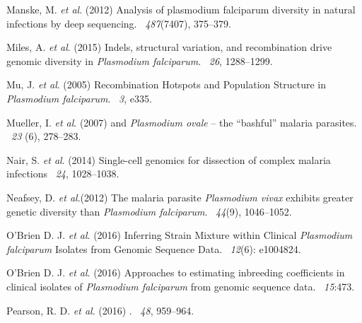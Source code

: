 \documentclass{article}
\begin{document}
\begin{thebibliography}{}
Manske, M. {\em et al}. (2012)
\newblock Analysis of plasmodium falciparum diversity in natural infections by
  deep sequencing.
~{\em 487\/}(7407), 375--379.

Miles, A. {\em et al}. (2015)
\newblock Indels, structural variation, and recombination drive genomic diversity in {\it Plasmodium falciparum}.
~{\em26\/}, 1288--1299.

Mu, J. {\em et al}. (2005)
\newblock Recombination Hotspots and Population Structure in {\it Plasmodium falciparum}.
~{\em 3}, e335.

Mueller, I. {\em et al}. (2007)
 and {\it Plasmodium ovale} -- the ``bashful'' malaria parasites.
~{\em 23\/} (6), 278--283.

Nair, S. {\em et al}. (2014)
\newblock Single-cell genomics for dissection of complex malaria infections
~{\em 24}, 1028--1038.

Neafsey, D. {\em et al}.(2012)
\newblock The malaria parasite {\it Plasmodium vivax} exhibits greater genetic diversity than {\it Plasmodium falciparum}.
~{\em 44\/}(9), 1046--1052.

O'Brien D. J. {\em et al}. (2016)
\newblock Inferring Strain Mixture within Clinical {\em Plasmodium falciparum} Isolates from Genomic Sequence Data.
~{\em 12\/}(6): e1004824.

O'Brien D. J. {\em et al}. (2016)
\newblock Approaches to estimating inbreeding coefficients in clinical isolates of {\it Plasmodium falciparum} from genomic sequence data.
~{\em 15}:473.


Pearson, R. D. {\em et al}. (2016)
.
~{\em 48}, 959--964.



\end{thebibliography}
\end{document}
